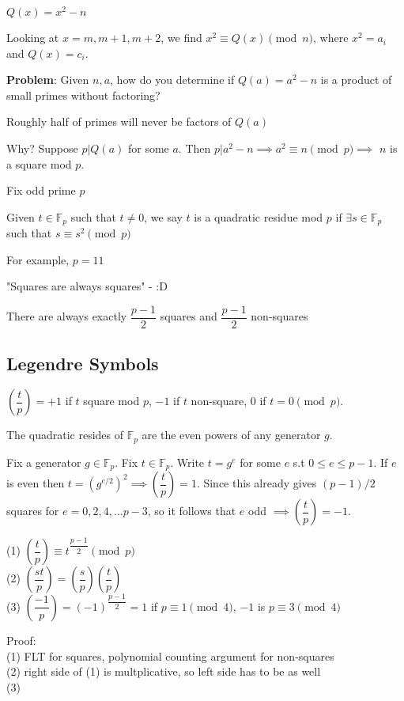 \documentclass[twoside, 10pt]{article}
\newcommand{\F}{\mathbb{F}}
\begin{document}
$Q(x) = x^2 - n$

Looking at $x = m, m+1, m+2$, we find $x^2 \equiv Q(x) \pmod{n}$, where $x^2 = a_i$ and $Q(x) = c_i$.

\textbf{Problem}: Given $n, a$, how do you determine if $Q(a) = a^2 - n$ is a product of small primes without factoring?


\begin{rmk}
    Roughly half of primes will never be factors of $Q(a)$
\end{rmk}
Why? Suppose $p | Q(a)$ for some $a$. Then $p | a^2 - n \implies a^2 \equiv n \pmod{p} \implies$ $n$ is a square mod $p$.

Fix odd prime $p$

\begin{defn}
    Given $t\in \F_p$ such that $t\neq 0$, we say $t$ is a quadratic residue mod $p$ if $\exists s \in \F_p$ such that $s\equiv s^2 \pmod{p}$
\end{defn}
For example, $p=11$

"Squares are always squares" - :D

There are always exactly $\dfrac{p-1}{2}$ squares and $\dfrac{p-1}{2}$ non-squares 

\subsection{Legendre Symbols}
\begin{defn}
    $\left(\dfrac{t}{p}\right) = +1$ if $t$ square mod $p$, $-1$ if $t$ non-square, $0$ if $t = 0 \pmod{p}$.
\end{defn}

\begin{rmk}
    The quadratic resides of $\F_p$ are the even powers of any generator $g$.
\end{rmk}
Fix a generator $g\in \F_p$. Fix $t\in \F_p$. Write $t = g^e$ for some $e$ s.t $0\leq e \leq p-1$. If $e$ is even then $t = (g^{e/2})^2 \implies \left(\dfrac{t}{p}\right) = 1$. Since this already gives $(p-1)/2$ squares for $e = 0, 2, 4, \ldots p-3$, so it follows that $e$ odd $\implies \left(\dfrac{t}{p}\right) = -1$.

\begin{defn}
    (1) $\left(\dfrac{t}{p}\right) \equiv t^{\dfrac{p-1}{2}} \pmod{p}$\\
    (2) $\left(\dfrac{st}{p}\right) = \left(\dfrac{s}{p}\right)\left(\dfrac{t}{p}\right)$\\
    (3) $\left(\dfrac{-1}{p}\right) = (-1)^{\dfrac{p-1}{2}} = 1$ if $p\equiv 1\pmod{4}$, $-1$ is $p\equiv 3\pmod{4}$
\end{defn}
Proof:\\ 
(1) FLT for squares, polynomial counting argument for non-squares\\
(2) right side of (1) is multplicative, so left side has to be as well\\
(3) 
\end{document}
